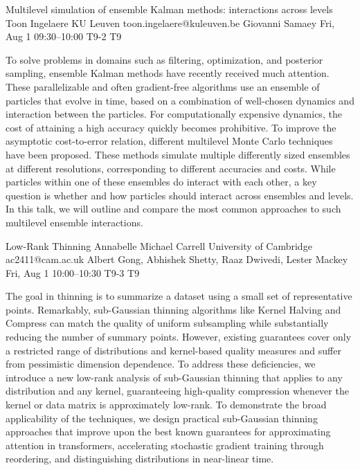 \documentclass[12pt,lettersize,oneside]{book} %
\begin{document}
\begin{talk}
  {Multilevel simulation of ensemble Kalman methods: interactions across levels}%
  {Toon Ingelaere}%
  {KU Leuven}%
  {toon.ingelaere@kuleuven.be}%
  {Giovanni Samaey}%
  {}%
  {Fri, Aug 1 09:30--10:00}%
  {T9-2}%
  {T9}%
  
    

        To solve problems in domains such as filtering, optimization, and posterior sampling,
        ensemble Kalman methods have recently received much attention. These parallelizable and often gradient-free algorithms use an ensemble of particles that evolve in time, based on a combination of well-chosen dynamics and interaction between the particles. For computationally expensive dynamics, the cost of attaining a high accuracy quickly becomes prohibitive. To improve the asymptotic cost-to-error relation, different multilevel Monte Carlo techniques have been proposed. These methods simulate multiple differently sized ensembles at different resolutions, corresponding to different accuracies and costs. While particles within one of these ensembles do interact with each other, a key question is whether and how particles should interact across ensembles and levels.
        In this talk, we will outline and compare the most common approaches to such multilevel ensemble interactions.

\medskip

\end{talk}

\begin{talk}
  {Low-Rank Thinning}%
  {Annabelle Michael Carrell}%
  {University of Cambridge}%
  {ac2411@cam.ac.uk}%
  {Albert Gong, Abhishek Shetty, Raaz Dwivedi, Lester Mackey}%
  {}%
  {Fri, Aug 1 10:00--10:30}%
  {T9-3}%
  {T9}%
  
    
   
The goal in thinning is to summarize a dataset using a small set of representative points. Remarkably, sub-Gaussian thinning algorithms like Kernel Halving and Compress can match the quality of uniform subsampling while substantially reducing the number of summary points. However, existing guarantees cover only a restricted range of distributions and kernel-based quality measures and suffer from pessimistic dimension dependence. To address these deficiencies, we introduce a new low-rank analysis of sub-Gaussian thinning that applies to any distribution and any kernel, guaranteeing high-quality compression whenever the kernel or data matrix is approximately low-rank. To demonstrate the broad applicability of the techniques, we design practical sub-Gaussian thinning approaches that improve upon the best known guarantees for approximating attention in transformers, accelerating stochastic gradient training through reordering, and distinguishing distributions in near-linear time. 

\medskip

\end{talk}
\end{document}
